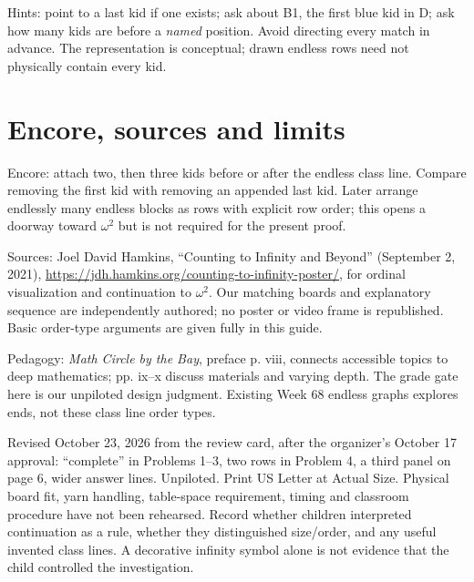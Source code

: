 \documentclass[11pt,letterpaper]{article}
\begin{document}
Hints: point to a last kid if one exists; ask about B1, the first blue kid in D; ask how many kids are before a \emph{named} position. Avoid directing every match in advance. The representation is conceptual; drawn endless rows need not physically contain every kid.
\newpage
\section*{Encore, sources and limits}
Encore: attach two, then three kids before or after the endless class line. Compare removing the first kid with removing an appended last kid. Later arrange endlessly many endless blocks as rows with explicit row order; this opens a doorway toward $\omega^2$ but is not required for the present proof.

Sources: Joel David Hamkins, ``Counting to Infinity and Beyond'' (September 2, 2021), \url{https://jdh.hamkins.org/counting-to-infinity-poster/}, for ordinal visualization and continuation to $\omega^2$. Our matching boards and explanatory sequence are independently authored; no poster or video frame is republished. Basic order-type arguments are given fully in this guide.

Pedagogy: \emph{Math Circle by the Bay}, preface p. viii, connects accessible topics to deep mathematics; pp. ix--x discuss materials and varying depth. The grade gate here is our unpiloted design judgment. Existing Week 68 endless graphs explores ends, not these class line order types.

Revised October 23, 2026 from the review card, after the organizer's October 17 approval: ``complete'' in Problems 1--3, two rows in Problem 4, a third panel on page 6, wider answer lines. Unpiloted. Print US Letter at Actual Size. Physical board fit, yarn handling, table-space requirement, timing and classroom procedure have not been rehearsed. Record whether children interpreted continuation as a rule, whether they distinguished size/order, and any useful invented class lines. A decorative infinity symbol alone is not evidence that the child controlled the investigation.
\end{document}
